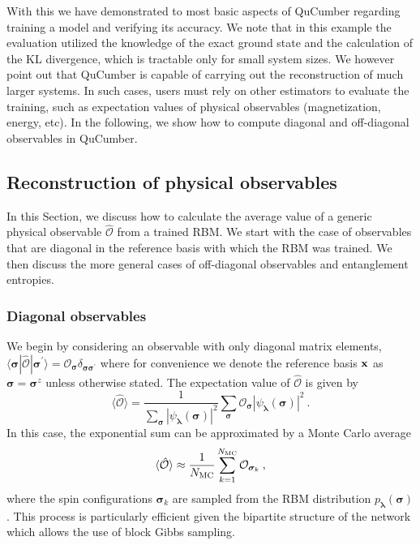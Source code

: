 \documentclass[submission, Phys, hidelnks]{SciPost}
\begin{document}
With this we have demonstrated to most basic aspects of QuCumber regarding training a model and verifying its accuracy. We note that in this example the evaluation utilized the knowledge of the exact ground state and the calculation of the KL divergence, which is tractable only for small system sizes.  We however point out that QuCumber is capable of carrying out the reconstruction of much larger systems. In such cases, users must rely on other estimators to evaluate the training, such as 
expectation values of physical observables (magnetization, energy, etc).
In the following, we show how to compute diagonal and off-diagonal observables in QuCumber. 

\subsection{Reconstruction of physical observables} \label{Sec:Sampling_a-Trained_RBM}
In this Section, we discuss how to calculate the average value of a generic physical observable $\hat{\mathcal{O}}$ from a trained RBM. We start with the case of observables that are diagonal in the reference basis with which the RBM was trained. We then discuss the more general cases of off-diagonal observables and entanglement entropies.

\subsubsection{Diagonal observables}
We begin by considering an observable with only diagonal matrix elements,
$\langle\bm{\sigma}|\hat{\mathcal{O}}|\bm{\sigma}^{\prime}\rangle=\mathcal{O}_{\bm{\sigma}}\delta_{\bm{\sigma\sigma}^\prime}$ where for convenience we denote the reference basis ${\bf x}$ as $\bm{\sigma}=\bm{\sigma}^z$ unless otherwise stated.
The expectation value of $\hat{\mathcal{O}}$ is given by
\begin{equation}
    \langle \hat{\mathcal{O}} \rangle = \frac{1}{\sum_{\bm{\sigma}} |\psi_{\bm{\lambda}}(\bm{\sigma})|^2}
    \sum_{\bm{\sigma}} \mathcal{O}_{\bm{\sigma}}|\psi_{\bm{\lambda}}(\bm{\sigma})|^2\:.
\end{equation}
In this case, the exponential sum can be approximated by a Monte Carlo average
\begin{equation}
    \langle \hat{\mathcal{O}}\rangle \approx \frac{1}{N_{\rm MC}} \sum_{k=1}^{N_{\rm MC}} \mathcal{O}_{\bm{\sigma}_k}\:,
\end{equation}
where the spin configurations $\bm{\sigma}_k$ are sampled from the RBM distribution $p_{\bm{\lambda}}(\bm{\sigma})$. This process is particularly efficient given the bipartite structure of the network which allows the use of block Gibbs sampling. 
\end{document}
